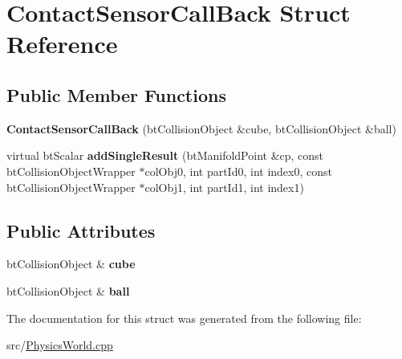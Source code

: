 \hypertarget{structContactSensorCallBack}{
\section{ContactSensorCallBack Struct Reference}
\label{structContactSensorCallBack}
}
\subsection*{Public Member Functions}
\begin{DoxyCompactItemize}
\item 
\hypertarget{structContactSensorCallBack_af6fcf69da9cf8aff359a738f53410681}{
{\bfseries ContactSensorCallBack} (btCollisionObject \&cube, btCollisionObject \&ball)}
\label{structContactSensorCallBack_af6fcf69da9cf8aff359a738f53410681}

\item 
\hypertarget{structContactSensorCallBack_aaa878aef161712920a460ce8fa83a152}{
virtual btScalar {\bfseries addSingleResult} (btManifoldPoint \&cp, const btCollisionObjectWrapper $\ast$colObj0, int partId0, int index0, const btCollisionObjectWrapper $\ast$colObj1, int partId1, int index1)}
\label{structContactSensorCallBack_aaa878aef161712920a460ce8fa83a152}

\end{DoxyCompactItemize}
\subsection*{Public Attributes}
\begin{DoxyCompactItemize}
\item 
\hypertarget{structContactSensorCallBack_ab6cef14aceedd9e712b4028520f80f36}{
btCollisionObject \& {\bfseries cube}}
\label{structContactSensorCallBack_ab6cef14aceedd9e712b4028520f80f36}

\item 
\hypertarget{structContactSensorCallBack_a1705071f8a335b4eb6978a92fcf322cc}{
btCollisionObject \& {\bfseries ball}}
\label{structContactSensorCallBack_a1705071f8a335b4eb6978a92fcf322cc}

\end{DoxyCompactItemize}


The documentation for this struct was generated from the following file:\begin{DoxyCompactItemize}
\item 
src/\hyperlink{PhysicsWorld_8cpp}{PhysicsWorld.cpp}\end{DoxyCompactItemize}
